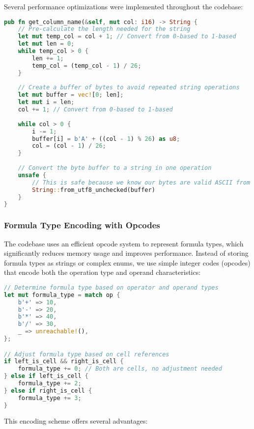 \documentclass[11pt,a4paper]{article}
\begin{document}
Several performance optimizations were implemented throughout the codebase:

\begin{lstlisting}[language=Rust, caption={Optimized column name conversion}, label=lst:perf-opt]
pub fn get_column_name(&self, mut col: i16) -> String {
    // Pre-calculate the length needed for the string
    let mut temp_col = col + 1; // Convert from 0-based to 1-based
    let mut len = 0;
    while temp_col > 0 {
        len += 1;
        temp_col = (temp_col - 1) / 26;
    }
    
    // Create a buffer of bytes to avoid repeated string operations
    let mut buffer = vec![0; len];
    let mut i = len;
    col += 1; // Convert from 0-based to 1-based
    
    while col > 0 {
        i -= 1;
        buffer[i] = b'A' + ((col - 1) % 26) as u8;
        col = (col - 1) / 26;
    }
    
    // Convert the byte buffer to a string in one operation
    unsafe {
        // This is safe because we know our bytes are valid ASCII from b'A' to b'Z'
        String::from_utf8_unchecked(buffer)
    }
}
\end{lstlisting}

\subsubsection{Formula Type Encoding with Opcodes}

The codebase uses an efficient opcode system to represent formula types, which significantly reduces memory usage and improves performance. Instead of storing formula types as strings or complex enums, we use simple integer codes (opcodes) that encode both the operation type and operand characteristics:

\begin{lstlisting}[language=Rust, caption={Formula type encoding with opcodes}, label=lst:formula-encoding]
// Determine formula type based on operator and operand types
let mut formula_type = match op {
    b'+' => 10,
    b'-' => 20,
    b'*' => 40,
    b'/' => 30,
    _ => unreachable!(),
};

// Adjust formula type based on cell references
if left_is_cell && right_is_cell {
    formula_type += 0; // Both are cells, no adjustment needed
} else if left_is_cell {
    formula_type += 2;
} else if right_is_cell {
    formula_type += 3;
}
\end{lstlisting}

This encoding scheme offers several advantages:
\end{document}
